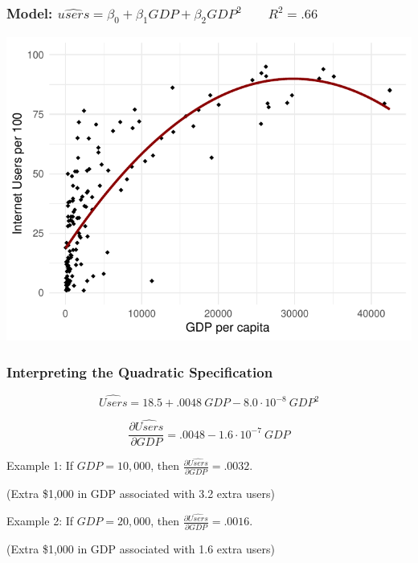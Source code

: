 \documentclass[12pt, block=fill]{beamer}
\begin{document}
\begin{frame}
  \frametitle{Model:
    $\widehat{users} = \beta_0 + \beta_1 GDP + \beta_2 GDP^2
    \quad\quad R^2 = .66$ }

  \includegraphics[width = \textwidth]{images/gdp6} 
\end{frame}


\begin{frame}
  \frametitle{Interpreting the Quadratic Specification}
  
  $$\widehat{Users} = 18.5 + .0048\ GDP - 8.0\cdot 10^{-8}\ GDP^2$$
  
  
  $$\frac{\partial \widehat{Users}}{\partial GDP} = .0048  - 1.6\cdot 10^{-7}\ GDP$$
  
  Example 1: If $GDP = 10,000$, then
  $\frac{\partial \widehat{Users}}{\partial GDP} = .0032$.
  
  (Extra \$1,000 in GDP associated with 3.2 extra users)
  
  Example 2: If $GDP = 20,000$, then
  $\frac{\partial \widehat{Users}}{\partial GDP} = .0016$.
  
  (Extra \$1,000 in GDP associated with 1.6 extra users)
  
\end{frame}
\end{document}
